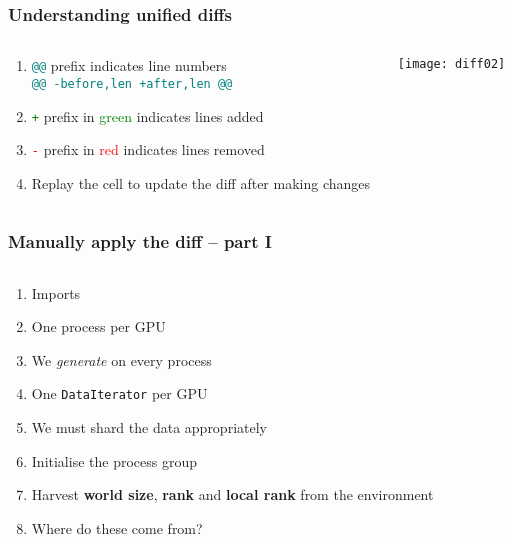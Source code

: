 \documentclass[
	notes=none,
	aspectratio=169
]{beamer}
\begin{document}
\begin{frame}
\frametitle{Understanding unified diffs}

\begin{columns}[T]
\begin{column}[T]{0.6\textwidth}
\setlength{\parskip}{0.5em}

\vspace{0.5cm}
\begin{enumerate}
\setlength{\parskip}{0.5em}
\item \textcolor{teal}{\tt @@} prefix indicates line numbers \\\textcolor{teal}{\tt @@ -before,len +after,len @@}
\item \textcolor{green}{\tt +} prefix in \textcolor{green}{green} indicates lines added
\item \textcolor{red}{\tt -} prefix in \textcolor{red}{red} indicates lines removed
\item Replay the cell to update the diff after making changes
\end{enumerate}

\end{column}
\begin{column}[T]{0.3\textwidth}
\setlength{\parskip}{0.5em}

\vspace{0.0cm}
\texttt{[image: diff02]}

\end{column}
\end{columns}

\end{frame}
\note{
}


\begin{frame}
\frametitle{Manually apply the diff -- part I}

\begin{columns}[T]
\begin{column}[T]{1.0\textwidth}
\setlength{\parskip}{0.5em}

\vspace{0.0cm}
\begin{enumerate}
\setlength{\parskip}{0.0em}
\item Imports
\item One process per GPU
\item We {\it generate\/} on every process
\item One {\tt DataIterator} per GPU
\item We must shard the data appropriately
\item Initialise the process group
\item Harvest {\bf world size}, {\bf rank} and {\bf local rank} from the environment
\item Where do these come from?
\end{enumerate}

\end{column}
\end{columns}

\end{frame}
\note{
}
\end{document}
